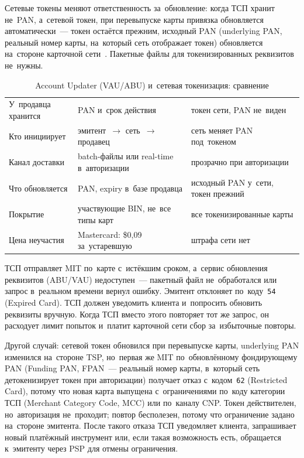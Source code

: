 Сетевые токены меняют ответственность за~обновление: когда ТСП хранит не~PAN,
а~сетевой токен, при перевыпуске карты привязка обновляется автоматически~--- токен
остаётся прежним, исходный PAN (underlying PAN, реальный номер карты,
на~который сеть отображает токен) обновляется на~стороне карточной
сети~\cite{visa-lifecycle-management}. Пакетные файлы для токенизированных
реквизитов не~нужны.

\begin{table}[tbp]
  \caption{Account Updater (VAU/ABU) и~сетевая токенизация: сравнение}\label{tab:credential-update-flow}
  \begingroup
  \tablesetup
  \begin{tabularx}{\textwidth}{@{}B{0.2\textwidth} Y Y@{}}
    \toprule
    \headrow
     &  &
     \\
    \midrule
    У~продавца хранится & PAN и~срок действия & токен сети, PAN не~виден \\
    \rowsep
    Кто инициирует & эмитент~$\to$ сеть~$\to$ продавец &
    сеть меняет PAN под~токеном \\
    \rowsep
    Канал доставки & batch-файлы или real-time в~авторизации &
    прозрачно при авторизации \\
    \rowsep
    Что обновляется & PAN, expiry в~базе продавца &
    исходный PAN у~сети, токен прежний \\
    \rowsep
    Покрытие & участвующие BIN, не~все типы карт &
    все токенизированные карты \\
    \rowsep
    Цена неучастия & Mastercard: \$0,09 за~устаревшую & штрафа сети нет \\
    \bottomrule
  \end{tabularx}\par
  \endgroup
\end{table}

ТСП отправляет MIT по~карте с~истёкшим сроком, а~сервис обновления реквизитов
(ABU/VAU) недоступен~--- пакетный файл не~обработался или запрос в~реальном
времени вернул ошибку. Эмитент отклоняет по~коду~\texttt{54}
(Expired Card). ТСП должен уведомить клиента и~попросить обновить реквизиты
вручную. Когда ТСП вместо этого повторяет тот же запрос, он расходует лимит
попыток и~платит карточной сети сбор за~избыточные повторы.

Другой случай: сетевой токен обновился при перевыпуске карты, underlying PAN
изменился на~стороне TSP, но~первая же MIT по~обновлённому фондирующему PAN
(Funding PAN, FPAN~--- реальный номер карты, в~который сеть детокенизирует
токен при авторизации) получает отказ с~кодом~\texttt{62} (Restricted Card),
потому что новая карта выпущена с~ограничениями по~коду категории ТСП (Merchant
Category Code, MCC) или по~каналу CNP. Токен действителен, но~авторизация
не~проходит; повтор бесполезен, потому что ограничение задано на~стороне
эмитента. После такого отказа ТСП уведомляет клиента, запрашивает новый
платёжный инструмент или, если такая возможность есть, обращается к~эмитенту через PSP для
отмены ограничения.

